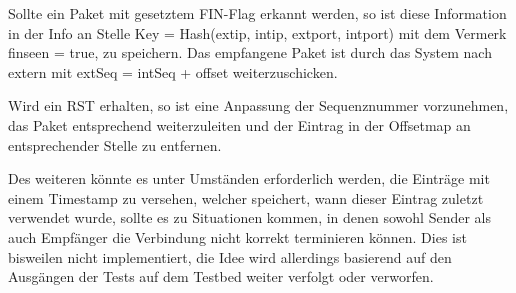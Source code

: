 \documentclass[../review_3.tex]{subfiles}
\begin{document}
Sollte ein Paket mit gesetztem FIN-Flag erkannt werden, so ist diese Information in der Info an Stelle Key = Hash(extip, intip, extport, intport) mit dem Vermerk finseen = true, zu speichern. Das empfangene Paket ist durch das System nach extern mit extSeq = intSeq + offset weiterzuschicken.

Wird ein RST erhalten, so ist eine Anpassung der Sequenznummer vorzunehmen, das Paket entsprechend weiterzuleiten und der Eintrag in der Offsetmap an entsprechender Stelle zu entfernen.

Des weiteren könnte es unter Umständen erforderlich werden, die Einträge mit einem Timestamp zu versehen, welcher speichert, wann dieser Eintrag zuletzt verwendet wurde, sollte es zu Situationen kommen, in denen sowohl Sender als auch Empfänger die Verbindung nicht korrekt terminieren können. Dies ist bisweilen nicht implementiert, die Idee wird allerdings basierend auf den Ausgängen der Tests auf dem Testbed weiter verfolgt oder verworfen.
\end{document}
